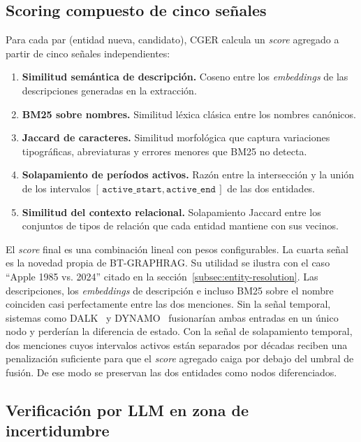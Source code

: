 \subsection{Scoring compuesto de cinco señales}

Para cada par (entidad nueva, candidato), CGER calcula un \emph{score} agregado a partir de cinco señales independientes:

\begin{enumerate}
    \item \textbf{Similitud semántica de descripción.} Coseno entre los \emph{embeddings} de las descripciones generadas en la extracción.
    \item \textbf{BM25 sobre nombres.} Similitud léxica clásica entre los nombres canónicos.
    \item \textbf{Jaccard de caracteres.} Similitud morfológica que captura variaciones tipográficas, abreviaturas y errores menores que BM25 no detecta.
    \item \textbf{Solapamiento de períodos activos.} Razón entre la intersección y la unión de los intervalos $[\,\texttt{active\_start}, \texttt{active\_end}\,]$ de las dos entidades.
    \item \textbf{Similitud del contexto relacional.} Solapamiento Jaccard entre los conjuntos de tipos de relación que cada entidad mantiene con sus vecinos.
\end{enumerate}

El \emph{score} final es una combinación lineal con pesos configurables. La cuarta señal es la novedad propia de BT-GRAPHRAG. Su utilidad se ilustra con el caso ``Apple 1985 vs. 2024'' citado en la sección~\ref{subsec:entity-resolution}. Las descripciones, los \emph{embeddings} de descripción e incluso BM25 sobre el nombre coinciden casi perfectamente entre las dos menciones. Sin la señal temporal, sistemas como DALK~\cite{dalk2024} y DYNAMO~\cite{dynamo2025} fusionarían ambas entradas en un único nodo y perderían la diferencia de estado. Con la señal de solapamiento temporal, dos menciones cuyos intervalos activos están separados por décadas reciben una penalización suficiente para que el \emph{score} agregado caiga por debajo del umbral de fusión. De ese modo se preservan las dos entidades como nodos diferenciados.

\subsection{Verificación por LLM en zona de incertidumbre}

